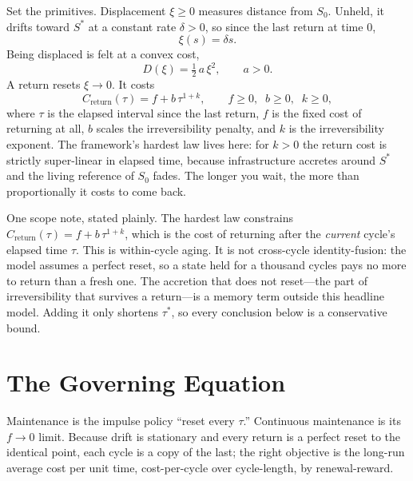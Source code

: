 \documentclass[12pt]{article}
\begin{document}
Set the primitives. Displacement $\xi\ge 0$ measures distance from $S_0$. Unheld, it drifts toward $S^*$ at a constant rate $\delta>0$, so since the last return at time $0$,
\begin{equation}
\xi(s)=\delta s.
\end{equation}
Being displaced is felt at a convex cost,
\begin{equation}
D(\xi)=\tfrac{1}{2}\,a\,\xi^2,\qquad a>0.
\end{equation}
A return resets $\xi\to 0$. It costs
\begin{equation}
C_{\text{return}}(\tau)=f+b\,\tau^{1+k},\qquad f\ge 0,\;\; b\ge 0,\;\; k\ge 0,
\end{equation}
where $\tau$ is the elapsed interval since the last return, $f$ is the fixed cost of returning at all, $b$ scales the irreversibility penalty, and $k$ is the irreversibility exponent. The framework's hardest law lives here: for $k>0$ the return cost is strictly super-linear in elapsed time, because infrastructure accretes around $S^*$ and the living reference of $S_0$ fades. The longer you wait, the more than proportionally it costs to come back.

One scope note, stated plainly. The hardest law constrains $C_{\text{return}}(\tau)=f+b\,\tau^{1+k}$, which is the cost of returning after the \emph{current} cycle's elapsed time $\tau$. This is within-cycle aging. It is not cross-cycle identity-fusion: the model assumes a perfect reset, so a state held for a thousand cycles pays no more to return than a fresh one. The accretion that does not reset---the part of irreversibility that survives a return---is a memory term outside this headline model. Adding it only shortens $\tau^*$, so every conclusion below is a conservative bound.

\section{The Governing Equation}

Maintenance is the impulse policy ``reset every $\tau$.'' Continuous maintenance is its $f\to 0$ limit. Because drift is stationary and every return is a perfect reset to the identical point, each cycle is a copy of the last; the right objective is the long-run average cost per unit time, cost-per-cycle over cycle-length, by renewal-reward.
\end{document}
